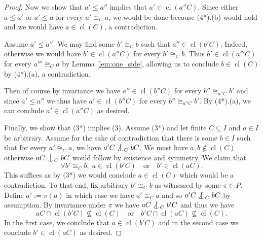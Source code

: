 \documentclass[10pt,a4paper]{amsart}
\DeclareMathOperator{\cl}{cl}
\newcommand{\forkindep}[1][]{%
  \mathrel{
    \mathop{
      \vcenter{
        \hbox{\oalign{\noalign{\kern-.3ex}\hfil$\vert$\hfil\cr
              \noalign{\kern-.7ex}
              $\smile$\cr\noalign{\kern-.3ex}}}
      }
    }\displaylimits_{#1}
  }
}
\newcommand{\isom}{\cong}
\begin{document}
\begin{proof}
Now we show that $a' \le a''$ implies that $a' \in \cl(a''C)$.
Since either $a \le a'$ or $a' \le a$ for every $a' \isom_C a$, we would be done because (4*).(b) would hold and we would have $a \in \cl(C)$, a contradiction.

Assume $a' \le a''$.
We may find some $b' \isom_C b$ such that $a'' \in \cl(b'C)$.
Indeed, otherwise we would have $b' \in \cl(a''C)$ for every $b' \isom_C b$.
Thus $b' \in \cl(a'''C)$ for every $a''' \isom_C a$ by Lemma \ref{lem:one_side}, allowing us to conclude $b \in \cl(C)$ by (4*).(a), a contradiction.

Then of course by invariance we have $a'' \in \cl(b''C)$ for every $b'' \isom_{a''C} b'$ and since $a' \le a''$ we thus have $a' \in \cl(b''C)$ for every $b'' \isom_{a''C} b'$.
By (4*).(a), we can conclude $a' \in \cl(a''C)$ as desired.

Finally, we show that (3*) implies (3).
Assume (3*) and let finite $C \subseteq I$ and $a \in I$ be arbitrary.
Assume for the sake of contradiction that there is some $b \in I$ such that for every $a' \isom_C a$, we have $a'C \not\forkindep[C] bC$.
We must have $a, b \not\in \cl(C)$ otherwise $aC \forkindep[C] bC$ would follow by existence and symmetry.
We claim that
\[ \forall b' \isom_C b, \; a \in \cl(b'C) \quad \text{or} \quad b' \in \cl(aC). \]
This suffices as by (3*) we would conclude $a \in \cl(C)$ which would be a contradiction.
To that end, fix arbitrary $b' \isom_C b$ as witnessed by some $\pi \in P$.
Define $a' := \pi(a)$ in which case we have $a' \isom_C a$ and so $a'C \not\forkindep[C] bC$ by assumption.
By invariance under $\pi$ we have $aC \not\forkindep[C] b'C$ and thus we have
\[ aC \cap \cl(b'C) \not\subseteq \cl(C) \quad \text{or} \quad b'C \cap \cl(aC) \not\subseteq \cl(C). \]
In the first case, we conclude that $a \in \cl(b'C)$ and in the second case we conclude $b' \in \cl(aC)$ as desired.
\end{proof}
\end{document}
